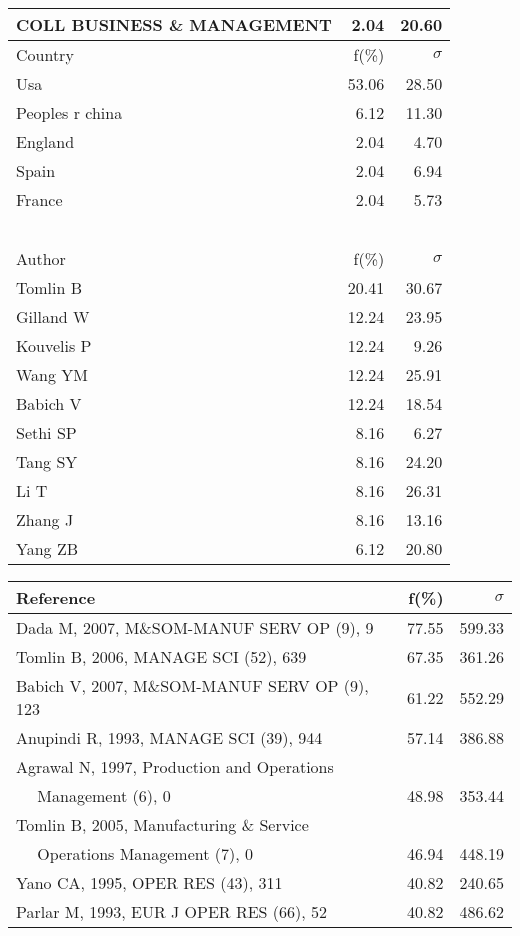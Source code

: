 \documentclass[a4paper,11pt]{report}
\begin{document}
\begin{landscape}
\begin{table}[!ht]
{\begin{tabular}{|l r r|}
COLL BUSINESS \& MANAGEMENT & 2.04 & 20.60\\
\hline
\hline
Country & f(\%) & $\sigma$\\
\hline
Usa & 53.06 & 28.50\\
Peoples r china & 6.12 & 11.30\\
England & 2.04 & 4.70\\
Spain & 2.04 & 6.94\\
France & 2.04 & 5.73\\
 &  & \\
 &  & \\
 &  & \\
 &  & \\
 &  & \\
\hline
\hline
Author & f(\%) & $\sigma$\\
\hline
Tomlin B & 20.41 & 30.67\\
Gilland W & 12.24 & 23.95\\
Kouvelis P & 12.24 & 9.26\\
Wang YM & 12.24 & 25.91\\
Babich V & 12.24 & 18.54\\
Sethi SP & 8.16 & 6.27\\
Tang SY & 8.16 & 24.20\\
Li T & 8.16 & 26.31\\
Zhang J & 8.16 & 13.16\\
Yang ZB & 6.12 & 20.80\\
\hline
\end{tabular}
}
{\scriptsize\begin{tabular}{|l r r|}
\hline
Reference & f(\%) & $\sigma$\\
\hline
Dada M, 2007, M\&SOM-MANUF SERV OP (9), 9 & 77.55 & 599.33\\
Tomlin B, 2006, MANAGE SCI (52), 639 & 67.35 & 361.26\\
Babich V, 2007, M\&SOM-MANUF SERV OP (9), 123 & 61.22 & 552.29\\
Anupindi R, 1993, MANAGE SCI (39), 944 & 57.14 & 386.88\\
Agrawal N, 1997, Production and Operations &  & \\
$\quad$ Management (6), 0 & 48.98 & 353.44\\
Tomlin B, 2005, Manufacturing \& Service &  & \\
$\quad$ Operations Management (7), 0 & 46.94 & 448.19\\
Yano CA, 1995, OPER RES (43), 311 & 40.82 & 240.65\\
Parlar M, 1993, EUR J OPER RES (66), 52 & 40.82 & 486.62\\

\end{tabular}}
\end{table}
\end{landscape}
\end{document}
